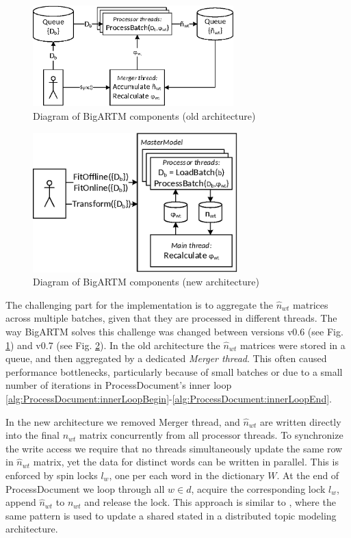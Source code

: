 \documentclass[russian,english]{llncs}
\newcommand{\kw}[1]{\textsf{#1}}
\begin{document}
\begin{figure}[t]
	\begin{centering}
		\includegraphics[height=39mm]{diagramm_artm_core.eps}
		\caption{Diagram of BigARTM components (old architecture)}
		\label{fig:diagramm_artm_core}
	\end{centering}
\end{figure}
\begin{figure}[t]
	\begin{centering}
		\includegraphics[height=54mm]{diagramm_artm_core_v07.eps}
		\caption{Diagram of BigARTM components (new architecture)}
		\label{fig:diagramm_artm_core_v07}
	\end{centering}
\end{figure}

The challenging part for the implementation is to aggregate the $\hat n_{wt}$ matrices across multiple batches, given that they are processed in different threads.
The way BigARTM solves this challenge was changed between versions \kw{v0.6} (see Fig. \ref{fig:diagramm_artm_core}) and \kw{v0.7} (see Fig. \ref{fig:diagramm_artm_core_v07}).
In the old architecture the $\hat n_{wt}$ matrices were stored in a queue, and then aggregated by a dedicated \emph{Merger thread}.
This often caused performance bottlenecks, particularly because of small batches or due to a small number of iterations in \kw{ProcessDocument}'s inner loop 
\ref{alg:ProcessDocument:innerLoopBegin}-\ref{alg:ProcessDocument:innerLoopEnd}.

In the new architecture we removed Merger thread, and $\hat n_{wt}$ are written directly into the final $n_{wt}$ matrix
concurrently from all processor threads.
To synchronize the write access we require that
no threads simultaneously update the same row in $\hat n_{wt}$ matrix,
yet the data for distinct words can be written in parallel.
This is enforced by spin locks $l_w$, one per each word in the dictionary $W$.
At the end of \kw{ProcessDocument} we loop through all $w \in d$, acquire the corresponding lock $l_w$, append $\hat n_{wt}$ to $n_{wt}$ and release the lock.
This approach is similar to \cite{smola10architecture},
where the same pattern is used to update a shared stated in a distributed topic modeling architecture.
\end{document}
